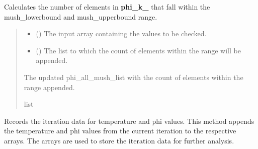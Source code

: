 \documentclass[a4paper,11pt,english,openany]{sphinxmanual}
\begin{document}
\begin{fulllineitems}
\begin{fulllineitems}
\label{\detokenize{api/spyice.models.sea_ice_model:spyice.models.sea_ice_model.SeaIceModel.phi_all_mush_list}}
\pysigstartsignatures
{}
\pysigstopsignatures
\sphinxAtStartPar
Calculates the number of elements in {\color{red}\bfseries{}phi\_k\_} that fall within the mush\_lowerbound and mush\_upperbound range.
\begin{quote}\begin{description}
\begin{itemize}
\item {} 
\sphinxAtStartPar
{} () \textendash{} The input array containing the values to be checked.

\item {} 
\sphinxAtStartPar
{} () \textendash{} The list to which the count of elements within the range will be appended.

\end{itemize}

\sphinxAtStartPar
The updated phi\_all\_mush\_list with the count of elements within the range appended.

\sphinxAtStartPar
list

\end{description}\end{quote}

\end{fulllineitems}


\begin{fulllineitems}
\label{\detokenize{api/spyice.models.sea_ice_model:spyice.models.sea_ice_model.SeaIceModel.record_iteration_data}}
\pysigstartsignatures
{}
\pysigstopsignatures
\sphinxAtStartPar
Records the iteration data for temperature and phi values.
This method appends the temperature and phi values from the current iteration to the respective arrays.
The arrays are used to store the iteration data for further analysis.
\begin{quote}\begin{description}
\sphinxAtStartPar
{}


\end{description}
\end{quote}
\end{fulllineitems}
\end{fulllineitems}
\end{document}
